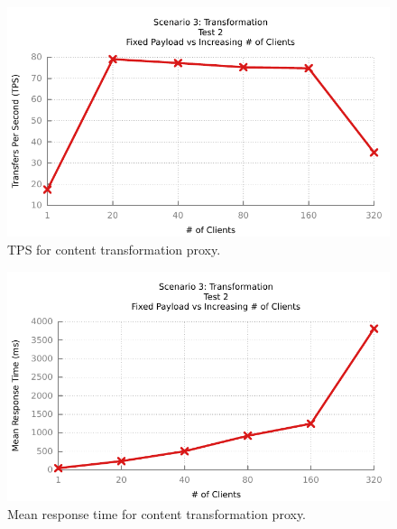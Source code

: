 \begin{figure}
	\centerline{\includegraphics{img/transform_fp_iu_tps}}
	\caption{TPS for content transformation proxy.}
	\label{fig:transform-2-1}
\end{figure}

\begin{figure}
	\centerline{\includegraphics{img/transform_fp_iu_resp}}
	\caption{Mean response time for content transformation proxy.}
	\label{fig:transform-2-2}
\end{figure}